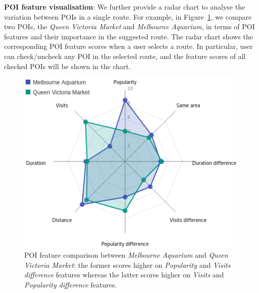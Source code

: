 \textbf{POI feature visualisation}: We further provide a radar chart to analyse the variation between POIs in a single route. 
For example, in Figure~\ref{fig:radar}, we compare two POIs, the \textit{Queen Victoria Market} and \textit{Melbourne Aquarium}, in terms of POI features and their importance in the suggested route. 
The radar chart shows the corresponding POI feature scores when a user selects a route.
In particular, user can check/uncheck any POI in the selected route, and the feature scores of all checked POIs will be shown in the chart.

\begin{figure}[t!]
\includegraphics[width=0.6\linewidth]{figure/sample_radar.png} \vspace{-10pt}
    \caption{POI feature comparison between \textit{Melbourne Aquarium} and \textit{Queen Victoria Market}: the former scores higher on \textit{Popularity} and \textit{Visits difference} features whereas the latter scores higher on \textit{Visits} and \textit{Popularity difference} features.}
\label{fig:radar} \vspace{-2em}
\end{figure}
